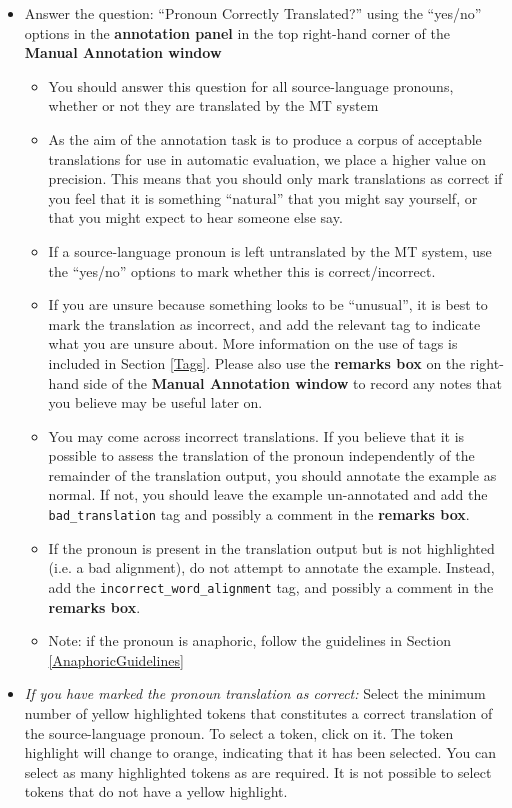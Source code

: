 \documentclass[11pt]{article} %
\newcommand\tag[1]{\texttt{#1}}
\begin{document}
\begin{itemize}
  \item Answer the question: ``Pronoun Correctly Translated?'' using the ``yes/no'' options in the \textbf{annotation panel} in the top right-hand corner of the \textbf{Manual Annotation window}
  \begin{itemize}
    \item You should answer this question for all source-language pronouns, whether or not they are translated by the MT system
    \item As the aim of the annotation task is to produce a corpus of acceptable translations for use in automatic evaluation, we place a higher value on precision. This means that you should only mark translations as correct if you feel that it is something ``natural'' that you might say yourself, or that you might expect to hear someone else say.
    \item If a source-language pronoun is left untranslated by the MT system, use the ``yes/no'' options to mark whether this is correct/incorrect.
    \item If you are unsure because something looks to be ``unusual'', it is best to mark the translation as incorrect, and add the relevant tag to indicate what you are unsure about. More information on the use of tags is included in Section \ref{Tags}. Please also use the \textbf{remarks box} on the right-hand side of the \textbf{Manual Annotation window} to record any notes that you believe may be useful later on.
    \item You may come across incorrect translations. If you believe that it is possible to assess the translation of the pronoun independently of the remainder of the translation output, you should annotate the example as normal. If not, you should leave the example un-annotated and add the \tag{bad\_translation} tag and possibly a comment in the \textbf{remarks box}.
    \item If the pronoun is present in the translation output but is not highlighted (i.e. a bad alignment), do not attempt to annotate the example. Instead, add the \tag{incorrect\_word\_alignment} tag, and possibly a comment in the \textbf{remarks box}.
    \item Note: if the pronoun is anaphoric, follow the guidelines in Section \ref{AnaphoricGuidelines}
  \end{itemize}
  \item \textit{If you have marked the pronoun translation as correct:} Select the minimum number of yellow highlighted tokens that constitutes a correct translation of the source-language pronoun. To select a token, click on it. The token highlight will change to orange, indicating that it has been selected. You can select as many highlighted tokens as are required. It is not possible to select tokens that do not have a yellow highlight.

\end{itemize}
\end{document}

